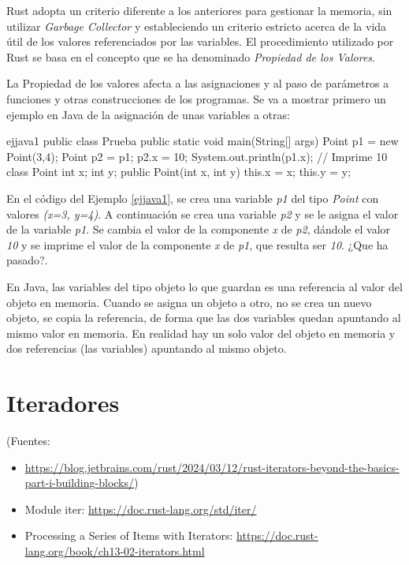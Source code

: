 \documentclass[a4paper,11pt]{extarticle}
\begin{document}
Rust adopta un criterio diferente a los anteriores para gestionar la memoria, sin utilizar \textit{Garbage Collector} y estableciendo un criterio estricto acerca de la vida útil de los valores referenciados por las variables. El procedimiento utilizado por Rust se basa en el concepto que se ha denominado \textit{Propiedad de los Valores}.
 
La Propiedad de los valores afecta a las asignaciones y al paso de parámetros a funciones y otras construcciones de los programas. Se va a mostrar primero un ejemplo en Java de la asignación de unas variables a otras:

\begin{EjemploCodigo}{ejjava1}
public class Prueba {
   public static void main(String[] args) {
      Point p1 = new Point(3,4);
      Point p2 = p1;
      p2.x = 10;
      System.out.println(p1.x); // Imprime 10
   }
}
class Point {
   int x;
   int y;	
   public Point(int x, int y) {
      this.x = x;
      this.y = y;
   }	
}
\end{EjemploCodigo}

En el código del Ejemplo \ref{ejjava1}, se crea una variable \textit{p1} del tipo \textit{Point} con valores \textit{(x=3, y=4)}. A continuación se crea una variable \textit{p2} y se le asigna el valor de la variable \textit{p1}. Se cambia el valor de la componente \textit{x} de \textit{p2}, dándole el valor \textit{10} y se imprime el valor de la componente \textit{x} de \textit{p1}, que resulta ser \textit{10}. ¿Que ha pasado?.

En Java, las variables del tipo objeto lo que guardan es una referencia al valor del objeto en memoria. Cuando se asigna un objeto a otro, no se crea un nuevo objeto, se copia la referencia, de forma que las dos variables quedan apuntando al mismo valor en memoria. En realidad hay un solo valor del objeto en memoria y dos referencias (las variables) apuntando al mismo objeto.


\section{Iteradores}

(Fuentes: 
\begin{itemize}
	\item \url{https://blog.jetbrains.com/rust/2024/03/12/rust-iterators-beyond-the-basics-part-i-building-blocks/})
	\item Module iter: \url{https://doc.rust-lang.org/std/iter/}
	\item Processing a Series of Items with Iterators: \url{https://doc.rust-lang.org/book/ch13-02-iterators.html}
\end{itemize}
\end{document}
